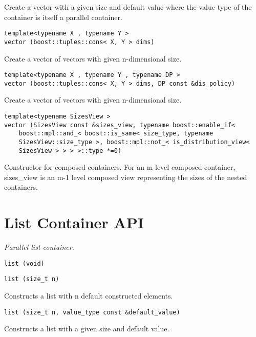 Create a vector with a given size and default value where the value type of the container is itself a parallel container. 
 
\begin{verbatim}
template<typename X , typename Y >
vector (boost::tuples::cons< X, Y > dims)
\end{verbatim}

Create a vector of vectors with given n-dimensional size. 
 
\begin{verbatim}
template<typename X , typename Y , typename DP >
vector (boost::tuples::cons< X, Y > dims, DP const &dis_policy)
\end{verbatim}

Create a vector of vectors with given n-dimensional size. 
 
\begin{verbatim}
template<typename SizesView >
vector (SizesView const &sizes_view, typename boost::enable_if< 
    boost::mpl::and_< boost::is_same< size_type, typename 
    SizesView::size_type >, boost::mpl::not_< is_distribution_view< 
    SizesView > > > >::type *=0)
\end{verbatim}

Constructor for composed containers. For an m level composed container, sizes\_view is an m-1 level composed view representing the sizes of the nested containers. 


\section{ List Container API } \label{sec-list-cont}

\emph{ Parallel list container. }

\begin{verbatim}
list (void)
\end{verbatim}
 
\begin{verbatim}
list (size_t n)
\end{verbatim}

Constructs a list with n default constructed elements.
 
\begin{verbatim}
list (size_t n, value_type const &default_value)
\end{verbatim}

Constructs a list with a given size and default value. 
 
